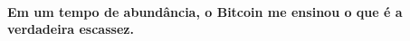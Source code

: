 \paragraph{Em um tempo de abundância, o Bitcoin me ensinou o que é a verdadeira escassez.}

%
%
%
%
%
%
%
